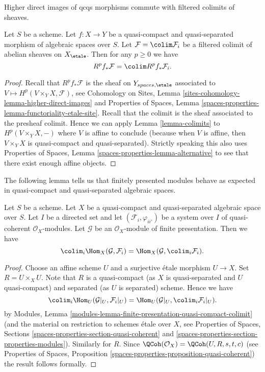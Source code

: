 \begin{lemma}
\label{lemma-colimit-cohomology}
\begin{slogan}
Higher direct images of qcqs morphisms commute with filtered colimits
of sheaves.
\end{slogan}
Let $S$ be a scheme. Let $f : X \to Y$ be a quasi-compact and quasi-separated
morphism of algebraic spaces over $S$. Let $\mathcal{F} = \colim \mathcal{F}_i$
be a filtered colimit of abelian sheaves on $X_\etale$.
Then for any $p \geq 0$ we have
$$
R^pf_*\mathcal{F} = \colim R^pf_*\mathcal{F}_i.
$$
\end{lemma}

\begin{proof}
Recall that $R^pf_*\mathcal{F}$ is the sheaf on $Y_{spaces, \etale}$
associated to $V \mapsto H^p(V \times_Y X, \mathcal{F})$, see
Cohomology on Sites, Lemma \ref{sites-cohomology-lemma-higher-direct-images}
and Properties of Spaces, Lemma
\ref{spaces-properties-lemma-functoriality-etale-site}.
Recall that the colimit is the sheaf associated to the presheaf colimit.
Hence we can apply Lemma \ref{lemma-colimits}
to $H^p(V \times_Y X, -)$ where $V$ is affine to conclude (because
when $V$ is affine, then $V \times_Y X$ is quasi-compact and quasi-separated).
Strictly speaking this also uses Properties of Spaces,
Lemma \ref{spaces-properties-lemma-alternative} to see that there exist
enough affine objects.
\end{proof}

\noindent
The following lemma tells us that finitely presented modules behave
as expected in quasi-compact and quasi-separated algebraic spaces.

\begin{lemma}
\label{lemma-finite-presentation-quasi-compact-colimit}
Let $S$ be a scheme. Let $X$ be a quasi-compact and quasi-separated
algebraic space over $S$. Let $I$ be a directed set and
let $(\mathcal{F}_i, \varphi_{ii'})$ be a system over $I$
of quasi-coherent $\mathcal{O}_X$-modules. Let $\mathcal{G}$ be an
$\mathcal{O}_X$-module of finite presentation. Then we have
$$
\colim_i \Hom_X(\mathcal{G}, \mathcal{F}_i)
=
\Hom_X(\mathcal{G}, \colim_i \mathcal{F}_i).
$$
\end{lemma}

\begin{proof}
Choose an affine scheme $U$ and a surjective \'etale morphism
$U \to X$. Set $R = U \times_X U$. Note that $R$ is a quasi-compact
(as $X$ is quasi-separated and $U$ quasi-compact) and separated (as
$U$ is separated) scheme. Hence we have
$$
\colim_i \Hom_U(\mathcal{G}|_U, \mathcal{F}_i|_U)
=
\Hom_U(\mathcal{G}|_U, \colim_i \mathcal{F}_i|_U).
$$
by Modules, Lemma \ref{modules-lemma-finite-presentation-quasi-compact-colimit}
(and the material on restriction to
schemes \'etale over $X$, see
Properties of Spaces, Sections \ref{spaces-properties-section-quasi-coherent}
and \ref{spaces-properties-section-properties-modules}). Similarly for $R$.
Since $\QCoh(\mathcal{O}_X) = \QCoh(U, R, s, t, c)$ (see
Properties of Spaces, Proposition
\ref{spaces-properties-proposition-quasi-coherent})
the result follows formally.
\end{proof}




